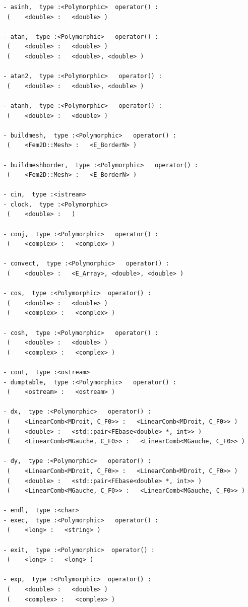 \documentclass[a4paper,twoside,12pt]{book}
\begin{document}
{\begin{verbatim}
  - asinh,  type :<Polymorphic>  operator() :
   (    <double> :   <double> )

  - atan,  type :<Polymorphic>   operator() :
   (    <double> :   <double> )
   (    <double> :   <double>, <double> )

  - atan2,  type :<Polymorphic>   operator() :
   (    <double> :   <double>, <double> )

  - atanh,  type :<Polymorphic>   operator() :
   (    <double> :   <double> )

  - buildmesh,  type :<Polymorphic>   operator() :
   (    <Fem2D::Mesh> :   <E_BorderN> )

  - buildmeshborder,  type :<Polymorphic>   operator() :
   (    <Fem2D::Mesh> :   <E_BorderN> )

  - cin,  type :<istream>
  - clock,  type :<Polymorphic>
   (    <double> :   )

  - conj,  type :<Polymorphic>   operator() :
   (    <complex> :   <complex> )

  - convect,  type :<Polymorphic>   operator() :
   (    <double> :   <E_Array>, <double>, <double> )

  - cos,  type :<Polymorphic>  operator() :
   (    <double> :   <double> )
   (    <complex> :   <complex> )

  - cosh,  type :<Polymorphic>   operator() :
   (    <double> :   <double> )
   (    <complex> :   <complex> )

  - cout,  type :<ostream>
  - dumptable,  type :<Polymorphic>   operator() :
   (    <ostream> :   <ostream> )

  - dx,  type :<Polymorphic>   operator() :
   (    <LinearComb<MDroit, C_F0>> :   <LinearComb<MDroit, C_F0>> )
   (    <double> :   <std::pair<FEbase<double> *, int>> )
   (    <LinearComb<MGauche, C_F0>> :   <LinearComb<MGauche, C_F0>> )

  - dy,  type :<Polymorphic>   operator() :
   (    <LinearComb<MDroit, C_F0>> :   <LinearComb<MDroit, C_F0>> )
   (    <double> :   <std::pair<FEbase<double> *, int>> )
   (    <LinearComb<MGauche, C_F0>> :   <LinearComb<MGauche, C_F0>> )

  - endl,  type :<char>
  - exec,  type :<Polymorphic>   operator() :
   (    <long> :   <string> )

  - exit,  type :<Polymorphic>  operator() :
   (    <long> :   <long> )

  - exp,  type :<Polymorphic>  operator() :
   (    <double> :   <double> )
   (    <complex> :   <complex> )


\end{verbatim}}
\end{document}
